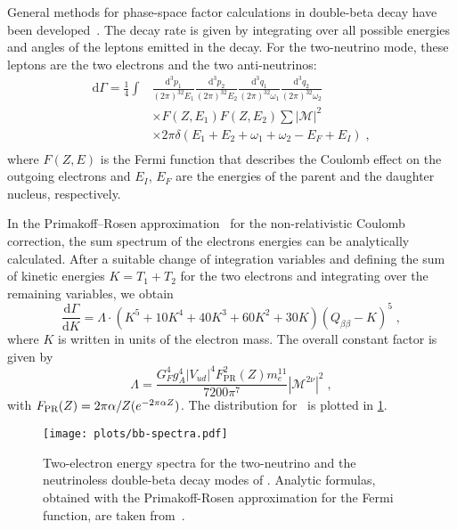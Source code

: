General methods for phase-space factor calculations in double-beta decay have
been developed~\cite{Doi1981,Doi1983,Tomoda1991}. The decay rate is given by
integrating over all possible energies and angles of the leptons emitted in the
decay. For the two-neutrino mode, these leptons are the two electrons and the
two anti-neutrinos:
\[
  \begin{split}
    \text{d}\Gamma = \frac{1}{4} \int & \frac{\text{d}^3p_1}{(2\pi)^32E_1}
                                        \frac{\text{d}^3p_2}{(2\pi)^32E_2}
                                        \frac{\text{d}^3q_1}{(2\pi)^32\omega_1}
                                        \frac{\text{d}^3q_2}{(2\pi)^32\omega_2} \\
                                      & \times F(Z,E_1) F(Z,E_2) \sum |\mathcal{M}|^2 \\
                                      & \times 2\pi\delta (E_1 + E_2 + \omega_1 +
                                        \omega_2 - E_F + E_I) \;, \\
  \end{split}
\]
where $F(Z,E)$ is the Fermi function that describes the Coulomb effect on the
outgoing electrons and $E_I$, $E_F$ are the energies of the parent and the
daughter nucleus, respectively.

In the Primakoff–Rosen approximation~\cite{Primakoff1959} for the
non-relativistic Coulomb correction, the sum spectrum of the electrons energies
can be analytically calculated. After a suitable change of integration
variables and defining the sum of kinetic energies $K=T_1+T_2$ for the two
electrons and integrating over the remaining variables, we obtain
\begin{equation}\label{eq:nbb:stdmodel}
  \frac{\text{d}\Gamma}{\text{d}K} = \Lambda \cdot (K^5+10K^4+40K^3+60K^2+30K)
                                     (Q_{\beta\beta}-K)^5 \;,
\end{equation}
where $K$ is written in units of the electron mass. The overall constant factor
is given by
\[
  \Lambda = \frac{G_F^4g_A^4|V_{ud}|^4F^2_\text{PR}(Z)m_e^{11}}{7200\pi^7}
            |\mathcal{M}^{2\nu}|^2 \;,
\]
with $F_\text{PR}(Z) = 2\pi\alpha/Z(\-e^{-2\pi\alpha Z})$. The distribution for
\gesix\ is plotted in \cref{fig:nbb:spectra}.

\begin{figure}
  \centering
  \texttt{[image: plots/bb-spectra.pdf]}
  \caption{%
    Two-electron energy spectra for the two-neutrino and the neutrinoless
    double-beta decay modes of \gesix. Analytic formulas, obtained with the
    Primakoff-Rosen approximation for the Fermi function, are taken
    from~\cite{Tretyak1995, Tretyak2002}.
  }\label{fig:nbb:spectra}
\end{figure}

